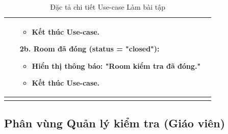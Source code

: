 \begin{longtable}{|p{}|p{}|}
\begin{enumerate}[topsep=2pt, itemsep=0pt]
\begin{itemize}[topsep=0pt, itemsep=0pt]
        \item Kết thúc Use-case.
    \end{itemize}
    \item[2b.] Room đã đóng (status = "closed"):
    \begin{itemize}[topsep=0pt, itemsep=0pt]
        \item Hiển thị thông báo: "Room kiểm tra đã đóng."
        \item Kết thúc Use-case.
    \end{itemize}
\end{enumerate} \\
\hline
\caption{Đặc tả chi tiết Use-case Làm bài tập}
\label{table:uc-do-exercise}
\end{longtable}

\clearpage

\subsection{Phân vùng Quản lý kiểm tra (Giáo viên)}


